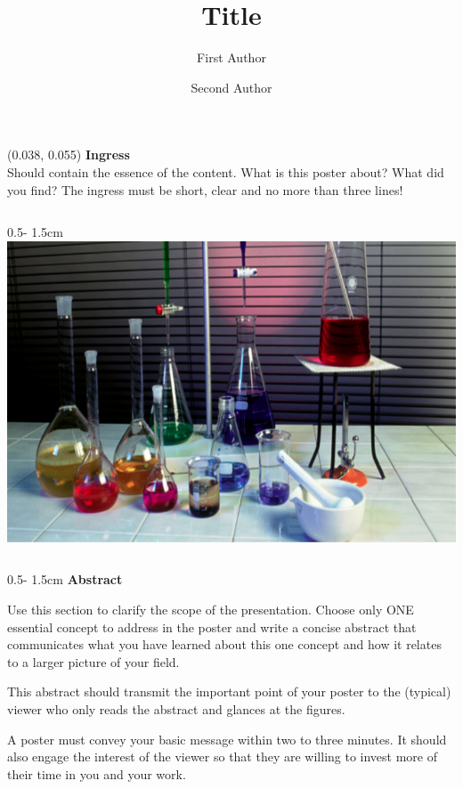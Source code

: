 \documentclass{uibposter}
\title{Title}
\author
{%
    First Author
    \and
    Second Author
}
\institute
{
    Department of mathematics -- University of Bergen
}
\begin{document}
\begin{textblock}{0.5}(0.038, 0.055)
    \color{white}
    \sffamily
    \textbf{Ingress}
    \\
Should contain the essence of the content. What is this poster about? What did you find? The ingress must be short, clear and no more than three lines!
\end{textblock}

\begin{frame}

\begin{columns}
\begin{column}{0.5\textwidth - 1.5cm}
    \includegraphics[width = \textwidth]{uibposter-images/bilde1.png}
    \vspace{0.5cm}

    \begin{column}{0.5\textwidth - 1.5cm}
        \textbf{Abstract}
\vspace{0.5cm}

Use this section to clarify the scope of the presentation. Choose only ONE essential concept to address in the poster and write a concise abstract that communicates what you have learned about this one concept and how it relates to a larger picture of your field.
\vspace{0.2cm}

This abstract should transmit the important point of your poster to the (typical) viewer who only reads the abstract and glances at the figures.
\vspace{0.2cm}

A poster must convey your basic message within two to three minutes. It should also engage the interest of the viewer so that they are willing to invest more of their time in you and your work.
\vspace{0.2cm}


\end{column}
\end{column}
\end{columns}
\end{frame}
\end{document}
